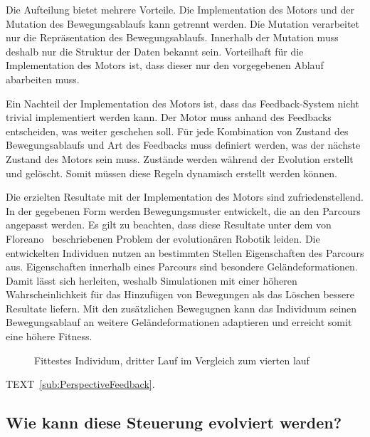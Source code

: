       \smallskip

      Die Aufteilung bietet mehrere Vorteile.
      Die Implementation des Motors und der Mutation des Bewegungsablaufs kann getrennt werden.
      Die Mutation verarbeitet nur die Repräsentation des Bewegungsablaufs.
      Innerhalb der Mutation muss deshalb nur die Struktur der Daten bekannt sein.
      Vorteilhaft für die Implementation des Motors ist, dass dieser nur den vorgegebenen Ablauf abarbeiten muss.

      \smallskip

      Ein Nachteil der Implementation des Motors ist, dass das Feedback-System nicht trivial implementiert werden kann.
      Der Motor muss anhand des Feedbacks entscheiden, was weiter geschehen soll.
      Für jede Kombination von Zustand des Bewegungsablaufs und Art des Feedbacks muss definiert werden,
      was der nächste Zustand des Motors sein muss.
      Zustände werden während der Evolution erstellt und gelöscht.
      Somit müssen diese Regeln dynamisch erstellt werden können.

      \smallskip

      Die erzielten Resultate mit der Implementation des Motors sind zufriedenstellend.
      In der gegebenen Form werden Bewegungsmuster entwickelt, die an den Parcours angepasst werden.
      Es gilt zu beachten, dass diese Resultate unter dem von Floreano~\cite{Floreano2010} beschriebenen Problem
      der evolutionären Robotik leiden.
      Die entwickelten Individuen nutzen an bestimmten Stellen Eigenschaften des Parcours aus.
      Eigenschaften innerhalb eines Parcours sind besondere Geländeformationen.
      Damit lässt sich herleiten,
      weshalb Simulationen mit einer höheren Wahrscheinlichkeit für das Hinzufügen von Bewegungen als das Löschen
      bessere Resultate liefern.
      Mit den zusätzlichen Bewegugnen kann das Individuum seinen Bewegungsablauf
      an weitere Geländeformationen adaptieren und erreicht somit eine höhere Fitness.


      \begin{figure}
        \centering
        
        \caption{Fittestes Individum, dritter Lauf im Vergleich zum vierten lauf}
      \end{figure}

      TEXT~\vref{sub:PerspectiveFeedback}.

    \subsection{Wie kann diese Steuerung evolviert werden?}

